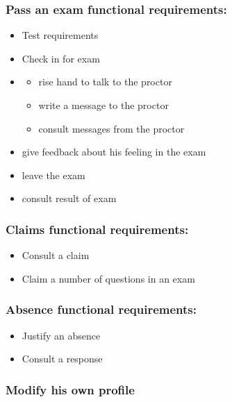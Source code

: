 \documentclass[a4paper,12p]{article}
\begin{document}
     \subsubsection{Pass an exam functional requirements:}
     \begin{itemize}
         \item Test requirements
         \item Check in for exam

         \item{}
         \begin{itemize}
             \item rise hand to talk to the proctor
             \item write a message to the proctor
             \item consult messages from the proctor
         \end{itemize}

         \item give feedback about his feeling in the exam
         \item leave the exam
         \item consult result of exam
     \end{itemize}

     \subsubsection{Claims functional requirements:}
     \begin{itemize}
         \item Consult a claim
         \item Claim a number of questions in an exam
     \end{itemize}

     \subsubsection{Absence functional requirements:}
     \begin{itemize}
         \item Justify an absence
         \item Consult a response
     \end{itemize}

     \subsubsection{Modify his own profile}
\end{document}
